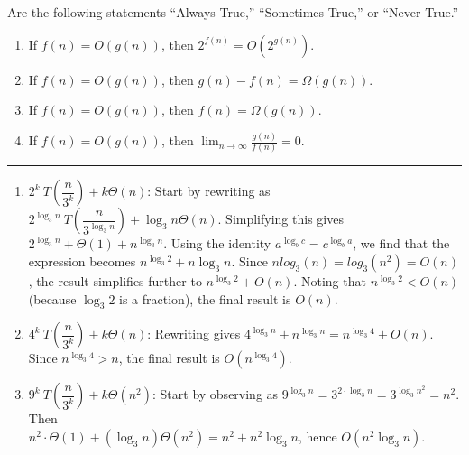 \newpage 

\begin{Exercise} Are the following statements ``Always True,'' ``Sometimes True,'' or ``Never True.''
    
    \begin{enumerate}
        \item If \(f(n) = O(g(n))\), then \(2^{f(n)} = O(2^{g(n)})\).
        \item If \(f(n) = O(g(n))\), then \(g(n) - f(n) = \Omega(g(n))\).
        \item If \(f(n) = O(g(n))\), then \(f(n) = \Omega(g(n))\).
        \item If \(f(n) = O(g(n))\), then \(\lim_{n \to \infty} \frac{g(n)}{f(n)} = 0\).
    \end{enumerate}
    
\end{Exercise}

\noindent\rule{\textwidth}{0.4pt}
    

\begin{Answer}

    \begin{enumerate}
        \item $2^{k}\ T \left(\dfrac{n}{3^k} \right) + k \Theta(n)$: Start by rewriting as $2^{\log_3n}\ T \left(\dfrac{n}{3^{\log_3n}} \right) + \log_3n \Theta(n)$.
        Simplifying this gives $2^{\log_3n} + \Theta(1) + n^{\log_3n}$. Using the identity $a^{\log_b c} = c^{\log_b a}$,
        we find that the expression becomes $n^{\log_3 2} + n \log_3n$. Since $nlog_3(n)=log_3(n^2)=O(n)$, the result simplifies further to $n^{\log_3 2} + O(n)$. Noting that $n^{\log_3 2} < O(n)$ (because $\log_3 2$ is a fraction), the final result is $O(n)$.
    
        \item $4^{k}\ T \left(\dfrac{n}{3^k} \right) + k \Theta(n)$: Rewriting gives $4^{\log_3n} + n^{\log_3n} = n^{\log_3 4} + O(n)$. Since $n^{\log_3 4} > n$, the final result is $O(n^{\log_3 4})$.
    
        \item $9^{k}\ T \left(\dfrac{n}{3^k} \right) + k \Theta(n^2)$: Start by observing as $9^{\log_3n} = 3^{2 \cdot \log_3n} = 3^{\log_3n^2} = n^2$. Then\\ $n^2\cdot\Theta(1)+(\log_3n)\Theta(n^2)=n^2+n^2\log_3n$, hence $O(n^2 \log_3n)$.
    \end{enumerate}
    
\end{Answer}

